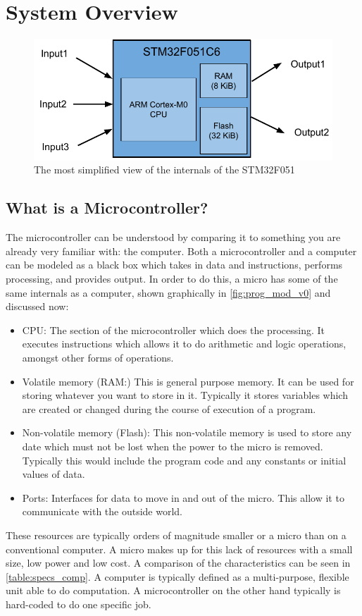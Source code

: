 \chapter{System Overview}

\begin{figure}[t]
  \centering
  \includegraphics[width=\textwidth]{./week1/programmers_model_v0.pdf}
  \caption{The most simplified view of the internals of the STM32F051}
  \label{fig:prog_mod_v0}
\end{figure}

\section{What is a Microcontroller?}
The microcontroller can be understood by comparing it to something you are already very familiar with: the computer. Both a microcontroller and a computer can be modeled as a black box which takes in data and instructions, performs processing, and provides output.
In order to do this, a micro has some of the same internals as a computer, shown graphically in \autoref{fig:prog_mod_v0} and discussed now:
\begin{itemize}
  \item CPU: The section of the microcontroller which does the processing. It executes instructions which allows it to do arithmetic and logic operations, amongst other forms of operations.
  \item  Volatile memory (RAM:) This is general purpose memory. It can be used for storing whatever you want to store in it. Typically it stores variables which are created or changed during the course of execution of a program.
  \item Non-volatile memory (Flash): This non-volatile memory is used to store any date which must not be lost when the power to the micro is removed. Typically this would include the program code and any constants or initial values of data.
  \item Ports: Interfaces for data to move in and out of the micro. This allow it to communicate with the outside world. 
\end{itemize} 
These resources are typically orders of magnitude smaller or a micro than on a conventional computer. A micro makes up for this lack of resources with a small size, low power and low cost. A comparison of the characteristics can be seen in \autoref{table:specs_comp}.
A computer is typically defined as a multi-purpose, flexible unit able to do computation. A microcontroller on the other hand typically is hard-coded to do one specific job.\\

